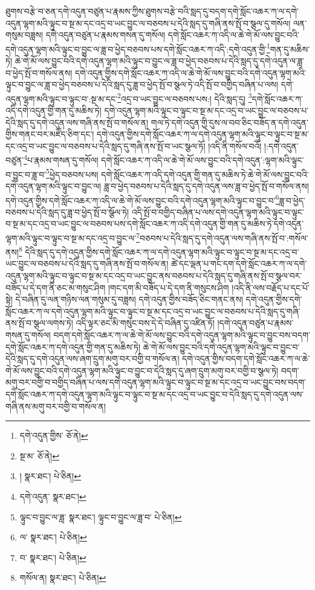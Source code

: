 ཐུགས་བརྩེ་བ་ཅན་དགེ་འདུན་བཙུན་པ་རྣམས་ཀྱིས་ཐུགས་བརྩེ་བའི་སླད་དུ་བདག་དགེ་སློང་འཆར་ཀ་ལ་དགེ་འདུན་ལྷག་མའི་ལྟུང་བ་སྔ་མ་དང་འདྲ་བ་ཡང་བྱུང་ལ་བཅབས་པ་དེའི་སླད་དུ་གཞི་ནས་སྤོ་བ་སྩལ་དུ་གསོལ། ལན་གསུམ་བཟླས། དགེ་འདུན་བཙུན་པ་རྣམས་གསན་དུ་གསོལ། དགེ་སློང་འཆར་ཀ་འདི་ལ་ཆེ་གེ་མོ་ལས་བྱུང་བའི་དགེ་འདུན་ལྷག་མའི་ལྟུང་བ་བྱུང་ལ་ཟླ་བ་ཕྱེད་བཅབས་པས་དགེ་སློང་འཆར་ཀ་འདི་:དགེ་འདུན་གྱི་\footnote{དགེ་འདུན་གྱིས་  ཅོ་ནེ། }གན་དུ་མཆིས་ཏེ། ཆེ་གེ་མོ་ལས་བྱུང་བའི་དགེ་འདུན་ལྷག་མའི་ལྟུང་བ་བྱུང་ལ་ཟླ་བ་ཕྱེད་བཅབས་པ་དེའི་སླད་དུ་དགེ་འདུན་ལ་ཟླ་བ་ཕྱེད་སྤོ་བ་གསོལ་ནས། དགེ་འདུན་གྱིས་དགེ་སློང་འཆར་ཀ་འདི་ལ་ཆེ་གེ་མོ་ལས་བྱུང་བའི་དགེ་འདུན་ལྷག་མའི་ལྟུང་བ་བྱུང་ལ་ཟླ་བ་ཕྱེད་བཅབས་པ་དེའི་སླད་དུ་ཟླ་བ་ཕྱེད་སྤོ་བ་སྩལ་ཏེ་འདི་སྤོ་བ་བགྱིད་བཞིན་པ་ལས། དགེ་འདུན་ལྷག་མའི་ལྟུང་བ་ལྟུང་བ་:སྔ་མ་དང་\footnote{སྔ་མ་  ཅོ་ནེ། }འདྲ་བ་ཡང་བྱུང་ལ་བཅབས་པས:། དེའི་སླད་དུ། \footnote{།    སྣར་ཐང་།  པེ་ཅིན། }དགེ་སློང་འཆར་ཀ་འདི་དགེ་འདུན་གྱི་གན་དུ་མཆིས་ཏེ། དགེ་འདུན་ལྷག་མའི་ལྟུང་བ་ལྟུང་བ་སྔ་མ་དང་འདྲ་བ་ཡང་བྱུང་ལ་བཅབས་པ་དེའི་སླད་དུ་དགེ་འདུན་ལས་གཞི་ནས་སྤོ་བ་གསོལ་ན། གལ་ཏེ་དགེ་འདུན་གྱི་དུས་ལ་བབ་ཅིང་བཟོད་ན་དགེ་འདུན་གྱིས་གནང་བར་མཛོད་ཅིག་དང་། དགེ་འདུན་གྱིས་དགེ་སློང་འཆར་ཀ་ལ་དགེ་འདུན་ལྷག་མའི་ལྟུང་བ་ལྟུང་བ་སྔ་མ་དང་འདྲ་བ་ཡང་བྱུང་ལ་བཅབས་པ་དེའི་སླད་དུ་གཞི་ནས་སྤོ་བ་ཡང་སྩལ་ཏོ། །འདི་ནི་གསོལ་བའོ། །:དགེ་འདུན་བཙུན་\footnote{དགེ་འདུན་  སྣར་ཐང་། }པ་རྣམས་གསན་དུ་གསོལ། དགེ་སློང་འཆར་ཀ་འདི་ལ་ཆེ་གེ་མོ་ལས་བྱུང་བའི་དགེ་འདུན་:ལྷག་མའི་ལྟུང་བ་བྱུང་བ་ཟླ་བ་\footnote{ལྟུང་བ་བྱུང་ལ་ཟླ་  སྣར་ཐང་། ལྟུང་བ་བྱུང་ལ་ཟླ་བ་  པེ་ཅིན། }ཕྱེད་བཅབས་པས། དགེ་སློང་འཆར་ཀ་འདི་དགེ་འདུན་གྱི་གན་དུ་མཆིས་ཏེ་ཆེ་གེ་མོ་ལས་བྱུང་བའི་དགེ་འདུན་ལྷག་མའི་ལྟུང་བ་བྱུང་ལ། ཟླ་བ་ཕྱེད་བཅབས་པ་དེའི་སླད་དུ་དགེ་འདུན་ལས་ཟླ་བ་ཕྱེད་སྤོ་བ་གསོལ་ནས། དགེ་འདུན་གྱིས་དགེ་སློང་འཆར་ཀ་འདི་ལ་ཆེ་གེ་མོ་ལས་བྱུང་བའི་དགེ་འདུན་ལྷག་མའི་ལྟུང་བ་བྱུང་བ་\footnote{ལ་  སྣར་ཐང་།  པེ་ཅིན། }ཟླ་བ་ཕྱེད་བཅབས་པ་དེའི་སླད་དུ་ཟླ་བ་ཕྱེད་སྤོ་བ་སྩོལ་ཏེ། འདི་སྤོ་བ་བགྱིད་བཞིན་པ་ལས་དགེ་འདུན་ལྷག་མའི་ལྟུང་བ་ལྟུང་བ་སྔ་མ་དང་འདྲ་བ་ཡང་བྱུང་ལ་བཅབས་པས་དགེ་སློང་འཆར་ཀ་འདི་དགེ་འདུན་གྱི་གན་དུ་མཆིས་ཏེ་དགེ་འདུན་ལྷག་མའི་ལྟུང་བ་ལྟུང་བ་སྔ་མ་དང་འདྲ་བ་བྱུང་ལ་\footnote{བ་  སྣར་ཐང་།  པེ་ཅིན། }བཅབས་པ་དེའི་སླད་དུ་དགེ་འདུན་ལས་གཞི་ནས་སྤོ་བ་:གསོལ་ནས།\footnote{གསོལ་ན།  སྣར་ཐང་།  པེ་ཅིན། } དེའི་སླད་དུ་དགེ་འདུན་གྱིས་དགེ་སློང་འཆར་ཀ་ལ་དགེ་འདུན་ལྷག་མའི་ལྟུང་བ་ལྟུང་བ་སྔ་མ་དང་འདྲ་བ་ཡང་བྱུང་ལ་བཅབས་པ་དེའི་སླད་དུ་གཞི་ནས་སྤོ་བ་གསོལ་ན། ཚེ་དང་ལྡན་པ་གང་དག་དགེ་སློང་འཆར་ཀ་ལ་དགེ་འདུན་ལྷག་མའི་ལྟུང་བ་ལྟུང་བ་སྔ་མ་དང་འདྲ་བ་ཡང་བྱུང་ནས་བཅབས་པ་དེའི་སླད་དུ་གཞི་ནས་སྤོ་བ་སྩལ་བར་བཟོད་པ་དེ་དག་ནི་ཅང་མ་གསུང་ཤིག །གང་དག་མི་བཟོད་པ་དེ་དག་ནི་གསུངས་ཤིག །འདི་ནི་ལས་བརྗོད་པ་དང་པོ་སྟེ། དེ་བཞིན་དུ་ལན་གཉིས་ལན་གསུམ་དུ་བཟླས། དགེ་འདུན་གྱིས་བཟོད་ཅིང་གནང་ནས། དགེ་འདུན་གྱིས་དགེ་སློང་འཆར་ཀ་ལ་དགེ་འདུན་ལྷག་མའི་ལྟུང་བ་ལྟུང་བ་སྔ་མ་དང་འདྲ་བ་ཡང་བྱུང་ལ་བཅབས་པ་དེའི་སླད་དུ་གཞི་ནས་སྤོ་བ་སྩལ་ལགས་ཏེ། འདི་ལྟར་ཅང་མི་གསུང་བས་དེ་དེ་བཞིན་དུ་འཛིན་ཏོ། །དགེ་འདུན་བཙུན་པ་རྣམས་གསན་དུ་གསོལ། བདག་དགེ་སློང་འཆར་ཀ་ལ་ཆེ་གེ་མོ་ལས་བྱུང་བའི་དགེ་འདུན་ལྷག་མའི་ལྟུང་བ་བྱུང་བས་བདག་དགེ་སློང་འཆར་ཀ་དགེ་འདུན་གྱི་གན་དུ་མཆིས་ཏེ། ཆེ་གེ་མོ་ལས་བྱུང་བའི་དགེ་འདུན་ལྷག་མའི་ལྟུང་བ་བྱུང་བ་དེའི་སླད་དུ་དགེ་འདུན་ལས་ཞག་དྲུག་མགུ་བར་བགྱི་བ་གསོལ་ན། དགེ་འདུན་གྱིས་བདག་དགེ་སློང་འཆར་ཀ་ལ་ཆེ་གེ་མོ་ལས་བྱུང་བའི་དགེ་འདུན་ལྷག་མའི་ལྟུང་བ་བྱུང་བ་དེའི་སླད་དུ་ཞག་དྲུག་མགུ་བར་བགྱི་བ་སྩལ་ཏེ། བདག་མགུ་བར་བགྱི་བ་བགྱིད་བཞིན་པ་ལས་དགེ་འདུན་ལྷག་མའི་ལྟུང་བ་ལྟུང་བ་སྔ་མ་དང་འདྲ་བ་ཡང་བྱུང་བས་བདག་དགེ་སློང་འཆར་ཀ་དགེ་འདུན་ལྷག་མའི་ལྟུང་བ་ལྟུང་བ་སྔ་མ་དང་འདྲ་བ་ཡང་བྱུང་བ་དེའི་སླད་དུ་དགེ་འདུན་ལས་གཞི་ནས་མགུ་བར་བགྱི་བ་གསོལ་ན། 
